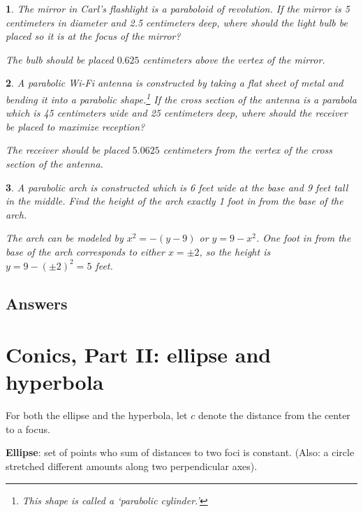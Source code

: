 \documentclass{amsbook}
\newtheorem{exc}{}
\newenvironment{ex}{\begin{exc}\normalfont}{\end{exc}}
\numberwithin{section}{chapter}
\numberwithin{equation}{chapter}
\begin{document}
\begin{ex}
	The mirror in Carl's flashlight is a paraboloid of revolution.  If the mirror is 5 centimeters in diameter and 2.5 centimeters deep, where should the light bulb be placed so it is at the focus of the mirror?
	\begin{sol}
		The bulb should be placed $0.625$ centimeters above the vertex of the mirror.
	\end{sol}
\end{ex}
\begin{ex}
	A parabolic Wi-Fi antenna is constructed by taking a flat sheet of metal and bending it into a parabolic shape.\footnote{This shape is called a `parabolic cylinder.'}  If the cross section of the antenna is a parabola which is 45 centimeters wide and 25 centimeters deep, where should the receiver be placed to maximize reception?
	\begin{sol}
		The receiver should be placed $5.0625$ centimeters from the vertex of the cross section of the antenna.
	\end{sol}
\end{ex}
\begin{ex} \label{parabolaarch}
	A parabolic arch is constructed which is 6 feet wide at the base and 9 feet tall in the middle. Find the height of the arch exactly 1 foot in from the base of the arch. 
	\begin{sol}
		The arch can be modeled by $x^2=-(y-9)$ or $y=9-x^2$.  One foot in from the base of the arch corresponds to either $x = \pm 2$, so the height is $y=9-(\pm 2)^2=5$ feet.
	\end{sol}
\end{ex}


\subsection*{Answers \nopunct} \hfill
\begin{multicols}{2}
	
\end{multicols}

\newpage
\section{Conics, Part II: ellipse and hyperbola}

For both the ellipse and the hyperbola, let $c$ denote the distance from the center to a focus.

\textbf{Ellipse}: set of points who sum of distances to two foci is constant. (Also: a circle stretched different amounts along two perpendicular axes).
\end{document}
